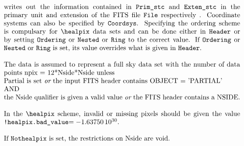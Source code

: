 \documentclass[12pt,twoside]{article}
\providecommand{\facname}{}%
\providecommand{\FACNAME}{}%
\def\lthtmlcheckvsize{\ifdim\ht\sizebox<\vsize 
  \ifdim\wd\sizebox<\hsize\expandafter\hfill\fi \expandafter\vfill
  \else\expandafter\vss\fi}%
\begin{document}
\renewcommand{\FACNAME}{{WRITE\_FITS\_SB}}
{\newpage\clearpage
{}%
$\textstyle \parbox{\hsize}{\facname {} writes out the information contained in {\tt{Prim\_stc}} and {\tt{Exten\_stc}} in the primary unit and extension of the FITS file
{\tt File} respectively . Coordinate systems can also be specified by {\tt Coordsys}. Specifying the
ordering scheme is compulsary for \healpix data sets and can be done either in {\tt Header} or by setting {\tt
Ordering} or {\tt Nested} or {\tt Ring} to the correct value. If {\tt
Ordering} or {\tt Nested} or {\tt Ring} is set, its value overrides what is
given in {\tt Header}. \\
\par
The data is assumed to represent a full sky data set with 
the number of data points npix = 12*Nside*Nside
unless   \hfill\newline
Partial is set {\em or} the input FITS header contains OBJECT =
               'PARTIAL' \hfill\newline
       AND \hfill\newline
         the Nside qualifier is given a valid value {\em or} the FITS header contains
                 a NSIDE.\\
\par
In the \healpix scheme, invalid or missing pixels should be given the value {\tt
!healpix.bad\_value}$= -1.63750\, 10^{30}$.\\
\par
If {\tt Nothealpix} is set, the restrictions on Nside are void.}$%
\lthtmlindisplaymathZ
\lthtmlcheckvsize\clearpage}


\renewcommand{\facname}{{write\_tqu }}

\renewcommand{\FACNAME}{{WRITE\_TQU }}
\end{document}
